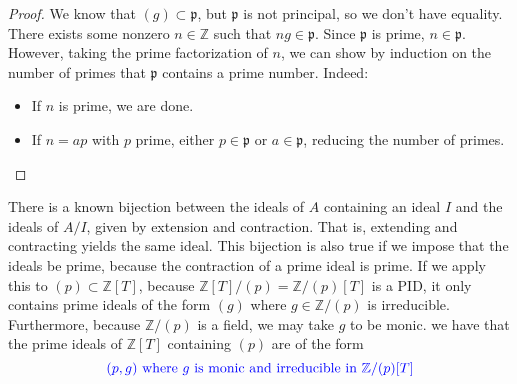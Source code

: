 \begin{problem}
\begin{sol}
\begin{enumerate}
\begin{claim}
\begin{proof}
                We know that $(g) \subset \mathfrak{p}$, but $\mathfrak{p}$ is not principal, so we don't have equality.
                There exists some nonzero $n \in \mathbb{Z}$ such that $ng \in \mathfrak{p}$.
                Since $\mathfrak{p}$ is prime, $n \in \mathfrak{p}$.
                However, taking the prime factorization of $n$, we can show by induction on the number of primes that $\mathfrak{p}$ contains a prime number.
                Indeed:
                \begin{itemize}
                    \item If $n$ is prime, we are done.
                    \item If $n = ap$ with $p$ prime, either $p \in \mathfrak{p}$ or $a \in \mathfrak{p}$, reducing the number of primes.
                \end{itemize}
            \end{proof}
        \end{claim}

        There is a known bijection between the ideals of $A$ containing an ideal $I$ and the ideals of $A/I$, given by extension and contraction.
        That is, extending and contracting yields the same ideal.
        This bijection is also true if we impose that the ideals be prime, because the contraction of a prime ideal is prime.
        If we apply this to $(p) \subset \mathbb{Z}[T]$,
        because $\mathbb{Z}[T]/(p) = \mathbb{Z}/(p)[T]$ is a PID,
        it only contains prime ideals of the form $(g)$ where $g \in \mathbb{Z}/(p)$ is irreducible.
        Furthermore, because $\mathbb{Z}/(p)$ is a field, we may take $g$ to be monic.
        we have that the prime ideals of $\mathbb{Z}[T]$ containing $(p)$ are of the form
        \[
            \textcolor{blue}{(p, g) \text{ where } g \text{ is monic and irreducible in } \mathbb{Z}/(p)[T]}
        \]

    \end{enumerate}
\end{sol}
\end{problem}